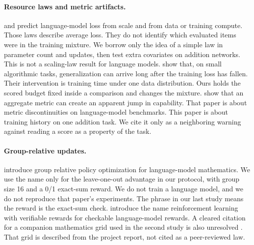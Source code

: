 \paragraph{Resource laws and metric artifacts.}
\citet{kaplan2020scaling} and \citet{hoffmann2022chinchilla} predict language-model loss from scale and from data or training compute.
Those laws describe average loss.
They do not identify which evaluated items were in the training mixture.
We borrow only the idea of a simple law in parameter count and updates, then test extra covariates on addition networks.
This is not a scaling-law result for language models.
\citet{power2022grokking} show that, on small algorithmic tasks, generalization can arrive long after the training loss has fallen.
Their intervention is training time under one data distribution.
Ours holds the scored budget fixed inside a comparison and changes the mixture.
\citet{schaeffer2023mirage} show that an aggregate metric can create an apparent jump in capability.
That paper is about metric discontinuities on language-model benchmarks.
This paper is about training history on one addition task.
We cite it only as a neighboring warning against reading a score as a property of the task.

\paragraph{Group-relative updates.}
\citet{shao2024deepseekmath} introduce group relative policy optimization for language-model mathematics.
We use the name only for the leave-one-out advantage in our protocol, with group size 16 and a 0/1 exact-sum reward.
We do not train a language model, and we do not reproduce that paper's experiments.
The phrase in our last study means the reward is the exact-sum check.
\citet{lambert2024tulu3} introduce the name reinforcement learning with verifiable rewards for checkable language-model rewards.
A cleared citation for a companion mathematics grid used in the second study is also unresolved .
That grid is described from the project report, not cited as a peer-reviewed law.
